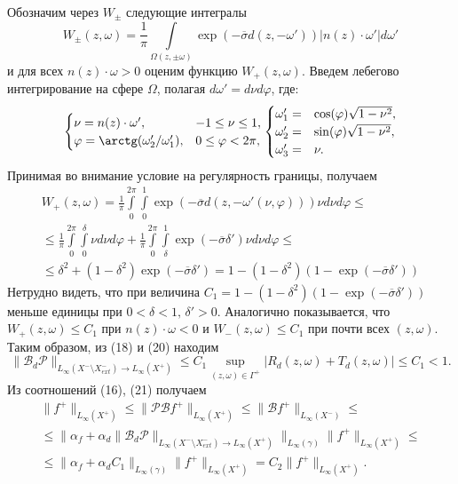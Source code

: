 \documentclass[12pt,reqno]{report}
\begin{document}
Обозначим через $W_{\pm}$ следующие интегралы
$$
W_{\pm}(z,\omega)=\frac{1}{\pi} \int \limits_{\Omega(z,\pm \omega)}\exp \left (- \overline{\sigma} d(z,-\omega')\right)  |n(z)\cdot \omega'| d\omega'
$$
и для всех $n(z) \cdot \omega>0$ оценим функцию $W_+(z,\omega)$.
Введем лебегово интегрирование на сфере $\Omega$, полагая $d\omega'=d\nu d\varphi$, где:
\begin{equation}
\begin{cases}
\nu = n(z) \cdot \omega', & -1 \leq \nu \leq 1, \\
\varphi= \arctg(\omega'_2/\omega'_1), & 0 \leq \varphi < 2 \pi,
\end{cases}
\begin{cases}
\omega'_1=&\cos (\varphi) \sqrt{1-\nu^2}, \\
\omega'_2=&\sin (\varphi) \sqrt{1-\nu^2}, \\
\omega'_3=&\nu.
\end{cases}
\end{equation}
Принимая во внимание  условие на регулярность границы, получаем 
\begin{multline}
W_+(z,\omega)=\frac{1}{\pi} \int \limits_{0}^{2\pi} \int \limits_{0}^{1} \exp \left (- \overline{\sigma} d(z,-\omega'(\nu,\varphi))\right)  \nu d \nu d\varphi \leq \\  \leq \frac{1}{\pi} \int \limits_{0}^{2\pi} \int \limits_{0}^{\delta}   \nu d \nu d\varphi
+ \frac{1}{\pi} \int \limits_{0}^{2\pi} \int \limits_{\delta}^{1} \exp \left (- \overline{\sigma}\delta'\right)  \nu d \nu d\varphi
\leq \\ \leq
\delta^2 +  (1-\delta^2)\exp \left (- \overline{\sigma} \delta'\right) =1-(1-\delta^2)(1-\exp \left (- \overline{\sigma} \delta'\right))
\end{multline}
Нетрудно видеть, что при величина $C_1=1-(1-\delta^2)(1-\exp \left (- \overline{\sigma} \delta'\right))$ меньше единицы  при    $0<\delta<1,\,\delta'>0$.
Аналогично показывается, что   $W_+(z,\omega) \leq C_1$ при  $n(z) \cdot \omega<0$ и $W_-(z,\omega) \leq C_1$ при  почти всех $(z,\omega)$. Таким образом, из (18) и (20) находим
\begin{equation}
\|\mathcal B_d \mathcal  P  \|_{L_{\infty}(X^-\setminus X^-_{ext})\to L_{\infty}(X^+)}  \leq    
C_1 \sup \limits_{(z,\omega) \in \Gamma^+}\left| R_d (z,\omega)+ T_d (z,\omega) \right| \leq C_1<1.
\end{equation}
Из соотношений (16), (21) получаем
\begin{multline}
\|f^+\|_{L_{\infty}(X^+)} \leq \|\mathcal P \mathcal B f^+\|_{L_{\infty}(X^+)} 
\leq 
\| \mathcal B f^+\|_{L_{\infty}(X^-)} 
\leq \\ \leq 
\|\alpha_f +\alpha_d \|\mathcal  B_d \mathcal P \|_{L_{\infty}(X^-\setminus X^-_{ext})\to L_{\infty}(X^+)} \|_{L_{\infty}(\gamma)}  \|  f^+\|_{L_{\infty}(X^+)} \leq \\ \leq 
 \|\alpha_f  +\alpha_d C_1 \|_{L_{\infty}(\gamma)}  \| f^+\|_{L_{\infty}(X^+)}= C_2\| f^+\|_{L_{\infty}(X^+)}.
\end{multline}
\end{document}
